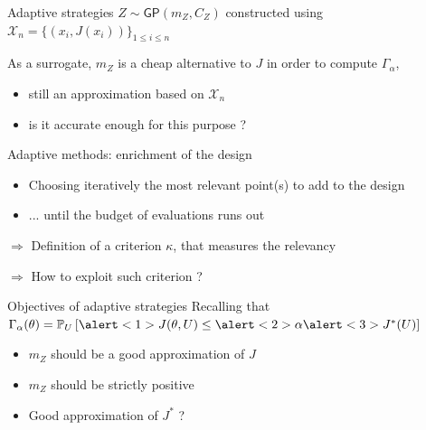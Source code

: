 \documentclass[10pt,aspectratio=169,usepdftitle=false]{beamer}
\newcommand{\GP}{\mathsf{GP}}
\newcommand{\Prob}{\mathbb{P}}
\newcommand{\kk}{\theta}
\newcommand{\UU}{U}
\begin{document}
\begin{frame}{Adaptive strategies}
  $Z \sim \GP(m_Z, C_Z)$ constructed using $\mathcal{X}_n = \{(x_i, J(x_i))\}_{1\leq i\leq n}$
  
  As a surrogate, $m_Z$ is a cheap alternative to $J$ in order to compute $\Gamma_{\alpha}$,
  \begin{itemize}
  \item still an approximation based on $\mathcal{X}_n$
  \item is it accurate enough for this purpose ?
  \end{itemize}
  \begin{block}{Adaptive methods: enrichment of the design}
    \begin{itemize}
    \item Choosing iteratively the most \alert{relevant} point(s) to add to the design
    \item ... until the budget of evaluations runs out
    \end{itemize}
  \end{block}
  $\Rightarrow$ Definition of a criterion $\kappa$, that measures the relevancy

  $\Rightarrow$ How to exploit such criterion ?
 \end{frame}

\begin{frame}{Objectives of adaptive strategies}
 Recalling that $\Gamma_{\alpha}(\kk) = \Prob_{\UU}\left[\alert<1>{J(\kk, \UU)} \leq \alert<2>{\alpha} \alert<3>{J^*(\UU)}\right]$
  \begin{itemize}
   \item \alert<1>{$m_Z$ should be a good approximation of $J$}
   \item \alert<2>{$m_Z$ should be strictly positive}
   \item \alert<3>{Good approximation of $J^*$ ?}
   \end{itemize}
 \end{frame}
\end{document}
